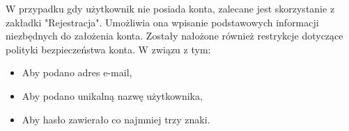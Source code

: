 \begin{minipage}{0.6\textwidth}
	
	W przypadku gdy użytkownik nie posiada konta, zalecane jest skorzystanie z zakładki "Rejestracja". Umożliwia ona wpisanie podstawowych informacji niezbędnych do założenia konta. Zostały nałożone również restrykcje dotyczące polityki bezpieczeństwa konta. W związu z tym:
	\begin{itemize}[noitemsep]
		\item Aby podano adres e-mail,
		\item Aby podano unikalną nazwę użytkownika,
		\item Aby hasło zawierało co najmniej trzy znaki.
	\end{itemize} 
	
\end{minipage}



